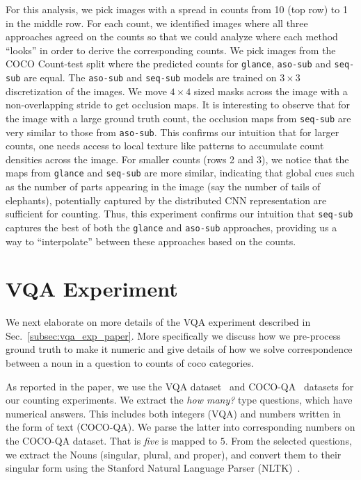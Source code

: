 \documentclass[10pt,twocolumn,letterpaper]{article}
\newcommand{\sub}{\texttt{aso-sub}\xspace}
\newcommand{\seq}{\texttt{seq-sub}\xspace}
\newcommand{\glance}{\texttt{glance}\xspace}
\newcommand{\refsec}[1]{Sec.~\ref{#1}}
\begin{document}
For this analysis, we pick images with a spread in counts from 10 (top row) to 1 in the middle row. For each count, we identified images where all three approaches agreed on the counts so that we could analyze where each method ``looks'' in order to derive the corresponding counts. We pick images from the COCO Count-test split where the predicted counts for \glance, \sub and \seq are equal. The \sub and \seq models are trained on $3\times3$ discretization of the images. We move $4\times4$ sized masks across the image with a non-overlapping stride to get occlusion maps. It is interesting to observe that for the image with a large ground truth count, the occlusion maps from \seq{} are very similar to those from \sub. This confirms our intuition that for larger counts, one needs access to local texture like patterns to accumulate count densities across the image. For smaller counts (rows 2 and 3), we notice that the maps from \glance and \seq are more similar, indicating that global cues such as the number of parts appearing in the image (say the number of tails of elephants), potentially captured by the distributed CNN representation are sufficient for counting. Thus, this experiment confirms our intuition that \seq captures the best of both the \glance{} and \sub{} approaches, providing us a way to ``interpolate'' between these approaches based on the counts.



 
\section{VQA Experiment}\label{sec:vqa_exp}
We next elaborate on more details of the VQA experiment described in \refsec{subsec:vqa_exp_paper}. More specifically we discuss how we pre-process ground truth to make it numeric and give details of how we solve correspondence between a noun in a question to counts of coco categories.

As reported in the paper, we use the  VQA dataset~\cite{vqa} and COCO-QA~\cite{Ren2015ExploringAnswering} datasets for our counting experiments. We extract the \emph{how many?} type questions, which have numerical answers. This includes both integers (VQA) and numbers written in the form of text (COCO-QA). We parse the latter into corresponding numbers on the COCO-QA dataset. That is \emph{five} is mapped to $5$. From the selected questions, we extract the Nouns (singular, plural, and proper), and convert them to their singular form using the Stanford Natural Language Parser (NLTK)~\cite{nltk}.
\end{document}
